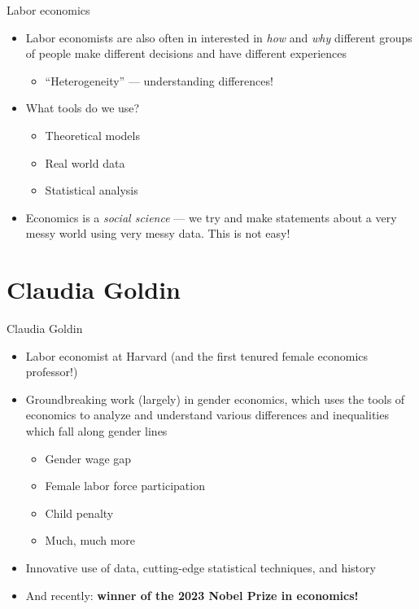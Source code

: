 \documentclass[aspectratio=169]{beamer}
\begin{document}
\begin{frame}{Labor economics}
    \begin{itemize}
        \item Labor economists are also often in interested in \textit{how} and \textit{why} different groups of people make different decisions and have different experiences
        \begin{itemize}
            \item ``Heterogeneity'' --- understanding differences!
        \end{itemize}
        \item What tools do we use?
        \begin{itemize}
            \item Theoretical models
            \item Real world data
            \item Statistical analysis
        \end{itemize}
        \item Economics is a \textit{social science} --- we try and make statements about a very messy world using very messy data. This is not easy!
    \end{itemize}
\end{frame}

\section{Claudia Goldin}

\begin{frame}{Claudia Goldin}
\begin{itemize}
    \item Labor economist at Harvard (and the first tenured female economics professor!)
    \item Groundbreaking work (largely) in gender economics, which uses the tools of economics to analyze and understand various differences and inequalities which fall along gender lines
    \begin{itemize}
        \item Gender wage gap 
        \item Female labor force participation
        \item Child penalty
        \item Much, much more
    \end{itemize}
    \item Innovative use of data, cutting-edge statistical techniques, and history
    \item And recently: \textbf{winner of the 2023 Nobel Prize in economics!}
\end{itemize}
\end{frame}
\end{document}
